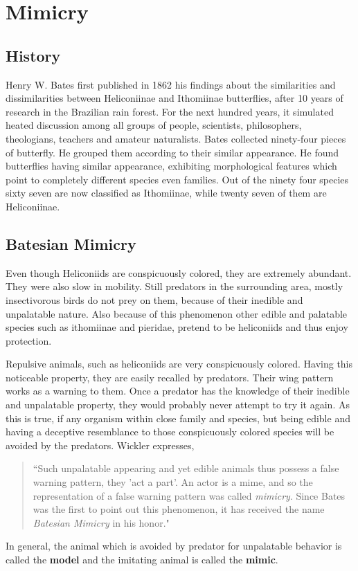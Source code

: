 \chapter{Mimicry}

\section{History}
Henry W. Bates first published in 1862 his findings about the similarities and dissimilarities between Heliconiinae and Ithomiinae butterflies, after 10 years of research in the Brazilian rain forest. For the next hundred years, it simulated heated discussion among all groups of people, scientists, philosophers, theologians, teachers and amateur naturalists. Bates collected ninety-four pieces of butterfly. He grouped them according to their similar appearance. He found butterflies having similar appearance, exhibiting morphological features which point to completely different species even families. Out of the ninety four species sixty seven are now classified as Ithomiinae, while twenty seven of them are Heliconiinae.

\section{Batesian Mimicry}
Even though Heliconiids are conspicuously colored, they are extremely abundant. They were also slow in mobility. Still predators in the surrounding area, mostly insectivorous birds do not prey on them, because of their inedible and unpalatable nature. Also because of this phenomenon other edible and palatable species such as ithomiinae and pieridae, pretend to be heliconiids and thus enjoy protection.

Repulsive animals, such as heliconiids are very conspicuously colored. Having this noticeable property, they are easily recalled by predators. Their wing pattern works as a warning to them. Once a predator has the knowledge of their inedible and unpalatable property, they would probably never attempt to try it again. As this is true, if any organism within close family and species, but being edible and having a deceptive resemblance to those conspicuously colored species will be avoided by the predators. Wickler \cite{wickler1986} expresses,
\begin{quote}
``Such unpalatable appearing and yet edible animals thus possess a false warning pattern, they 'act a part'. An actor is a mime, and so the representation of a false warning pattern was called \textit{mimicry}. Since Bates was the first to point out this phenomenon, it has received the name \textit{Batesian Mimicry} in his honor."
\end{quote}
In general, the animal which is avoided by predator for unpalatable behavior is called the \textbf{model} and the imitating animal is called the \textbf{mimic}.

